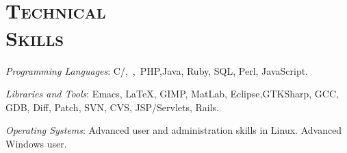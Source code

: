 \begin{resume}



 \begin{formatb}
   \\
   \body\\
 \end{formatb}



\section{\textsc{Technical\\ Skills}}

\emph{Programming Languages}: C/\Cplusplus,\ \CSharp,\ PHP,Java, Ruby, SQL, Perl, JavaScript.

\emph{Libraries and Tools}: Emacs, \LaTeX, GIMP, MatLab, Eclipse,GTKSharp, GCC, GDB, Diff, Patch, SVN, CVS, JSP/Servlets, Rails.

\emph{Operating Systems}: Advanced user and administration skills in Linux.  Advanced Windows user.


\end{resume}
